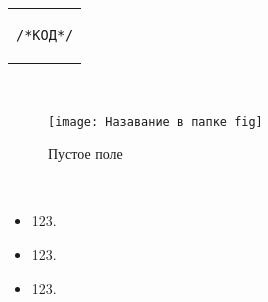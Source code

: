 \begin{tabular}{c}
    \setlength{\parindent}{2cm}

    \begin{lstlisting}[language=/*ЯЗЫК*/]
    /*КОД*/\end{lstlisting}
\end{tabular}\\



\begin{figure}[H]
    \centering
    \texttt{[image: Назавание в папке fig]}
    \caption{Пустое поле} %
    \label{fig:emptyField} %
\end{figure}\\

\begin{itemize}[nolistsep]
    \item 123.
    \item 123.
    \item 123.
\end{itemize}